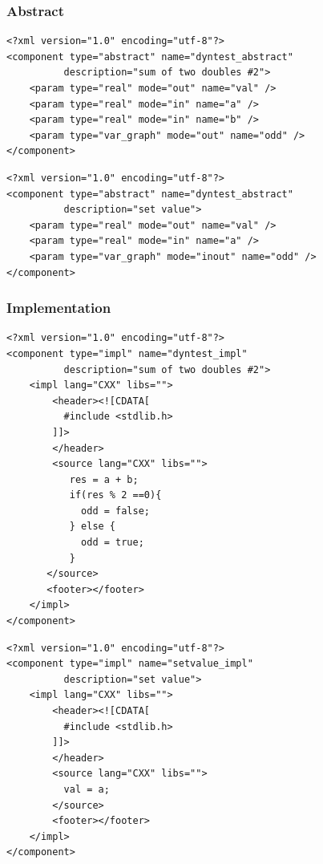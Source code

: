 \subsubsection{Abstract}

\lstset{language=XML}
\begin{lstlisting}[frame=single]
<?xml version="1.0" encoding="utf-8"?>
<component type="abstract" name="dyntest_abstract"
          description="sum of two doubles #2">
    <param type="real" mode="out" name="val" />
    <param type="real" mode="in" name="a" />
    <param type="real" mode="in" name="b" />
    <param type="var_graph" mode="out" name="odd" /> 
</component>
\end{lstlisting}

\lstset{language=XML}
\begin{lstlisting}[frame=single]
<?xml version="1.0" encoding="utf-8"?>
<component type="abstract" name="dyntest_abstract"
          description="set value">
    <param type="real" mode="out" name="val" />
    <param type="real" mode="in" name="a" />
    <param type="var_graph" mode="inout" name="odd" /> 
</component>
\end{lstlisting}

\subsubsection{Implementation}

\lstset{language=XML}
\begin{lstlisting}[frame=single]
<?xml version="1.0" encoding="utf-8"?>
<component type="impl" name="dyntest_impl"
          description="sum of two doubles #2">
    <impl lang="CXX" libs="">
        <header><![CDATA[
          #include <stdlib.h>
        ]]>
        </header>
        <source lang="CXX" libs="">
           res = a + b;
           if(res % 2 ==0){
             odd = false;
           } else {
             odd = true;
           }
       </source>
       <footer></footer>
    </impl>
</component>
\end{lstlisting}

\lstset{language=XML}
\begin{lstlisting}[frame=single]
<?xml version="1.0" encoding="utf-8"?>
<component type="impl" name="setvalue_impl"
          description="set value">
    <impl lang="CXX" libs="">
        <header><![CDATA[
          #include <stdlib.h>
        ]]>
        </header>
        <source lang="CXX" libs="">
          val = a;
        </source>
        <footer></footer>
    </impl>
</component>
\end{lstlisting}

